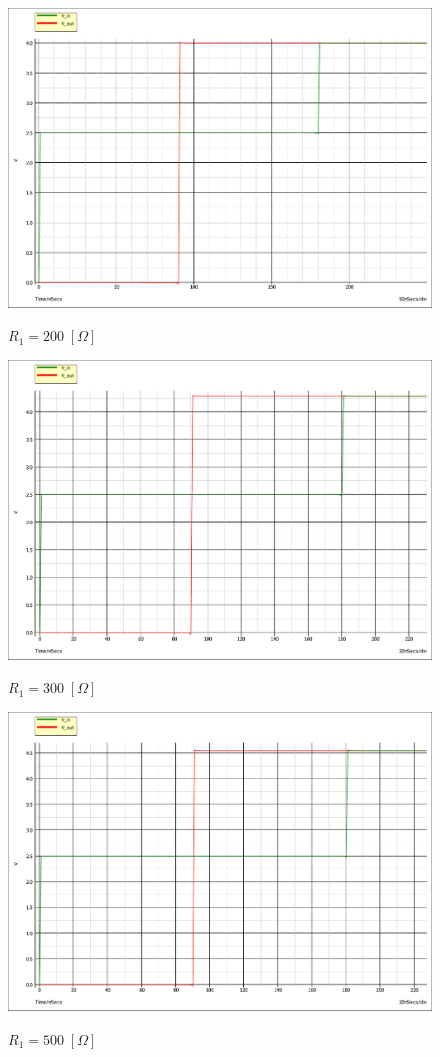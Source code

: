 \documentclass[a4paper,12pt]{report}
\begin{document}
\begin{figure}[!htb]
	\centering
	\includegraphics[width=.8\textwidth]{pictures/200ohm.pdf}
	\label{ergddwg}
	\caption{\label{luegrfffegegl} \small $R_1 = 200 \; [\Omega] $}
	\end{figure}

\begin{figure}[!htb]
	\centering
	\includegraphics[width=.8\textwidth]{pictures/300ohm.pdf}
	\label{ergw33xxg}
	\caption{\label{luegr33evvvgegl} \small $R_1 = 300 \; [\Omega]$ }
\end{figure}

\begin{figure}[!htb]
	\centering
	\includegraphics[width=.8\textwidth]{pictures/500ohm.pdf}
	\label{e55rgddwg}
	\caption{\label{luegr55fffegegl} \small $R_1 = 500 \; [\Omega] $}
\end{figure}
\end{document}
